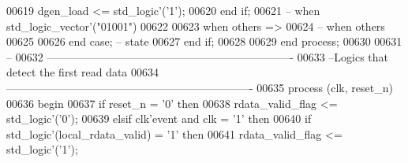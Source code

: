 \begin{DoxyCode}
00619                 \textcolor{vhdlchar}{dgen_load} \textcolor{vhdlchar}{<=} \textcolor{comment}{std\_logic}\textcolor{vhdlchar}{'}\textcolor{vhdlchar}{(}\textcolor{vhdlchar}{'}\textcolor{vhdllogic}{}\textcolor{vhdllogic}{1}\textcolor{vhdlchar}{'}\textcolor{vhdlchar}{)};
00620               \textcolor{keywordflow}{end} \textcolor{keywordflow}{if};
00621 \textcolor{keyword}{          -- when std\_logic\_vector'("01001") }
00622       
00623           \textcolor{keywordflow}{when} \textcolor{keywordflow}{others} \textcolor{vhdlchar}{=}\textcolor{vhdlchar}{>} 
00624 \textcolor{keyword}{          -- when others }
00625       
00626       \textcolor{keywordflow}{end} \textcolor{keywordflow}{case};\textcolor{keyword}{ -- state}
00627     \textcolor{keywordflow}{end} \textcolor{keywordflow}{if};
00628 
00629   \textcolor{keywordflow}{end} \textcolor{keywordflow}{process};
00630 
00631 \textcolor{keyword}{  --}
00632 \textcolor{keyword}{  -------------------------------------------------------------------}
00633 \textcolor{keyword}{  --Logics that detect the first read data}
00634 \textcolor{keyword}{  -------------------------------------------------------------------}
00635   \textcolor{keywordflow}{process} (clk, reset_n)
00636 \textcolor{vhdlkeyword}{  begin}
00637     \textcolor{keywordflow}{if} \textcolor{vhdlchar}{reset_n} \textcolor{vhdlchar}{=} \textcolor{vhdlchar}{'}\textcolor{vhdllogic}{}\textcolor{vhdllogic}{0}\textcolor{vhdlchar}{'} \textcolor{keywordflow}{then}
00638       \textcolor{vhdlchar}{rdata_valid_flag} \textcolor{vhdlchar}{<=} \textcolor{comment}{std\_logic}\textcolor{vhdlchar}{'}\textcolor{vhdlchar}{(}\textcolor{vhdlchar}{'}\textcolor{vhdllogic}{}\textcolor{vhdllogic}{0}\textcolor{vhdlchar}{'}\textcolor{vhdlchar}{)};
00639     \textcolor{keywordflow}{elsif} \textcolor{vhdlchar}{clk}\textcolor{vhdlchar}{'}\textcolor{vhdlkeyword}{event} \textcolor{keywordflow}{and} \textcolor{vhdlchar}{clk} \textcolor{vhdlchar}{=} \textcolor{vhdlchar}{'}\textcolor{vhdllogic}{}\textcolor{vhdllogic}{1}\textcolor{vhdlchar}{'} \textcolor{keywordflow}{then}
00640       \textcolor{keywordflow}{if} \textcolor{comment}{std\_logic}\textcolor{vhdlchar}{'}\textcolor{vhdlchar}{(}\textcolor{vhdlchar}{local_rdata_valid}\textcolor{vhdlchar}{)} \textcolor{vhdlchar}{=} \textcolor{vhdlchar}{'}\textcolor{vhdllogic}{}\textcolor{vhdllogic}{1}\textcolor{vhdlchar}{'} \textcolor{keywordflow}{then} 
00641         \textcolor{vhdlchar}{rdata_valid_flag} \textcolor{vhdlchar}{<=} \textcolor{comment}{std\_logic}\textcolor{vhdlchar}{'}\textcolor{vhdlchar}{(}\textcolor{vhdlchar}{'}\textcolor{vhdllogic}{}\textcolor{vhdllogic}{1}\textcolor{vhdlchar}{'}\textcolor{vhdlchar}{)};

\end{DoxyCode}
